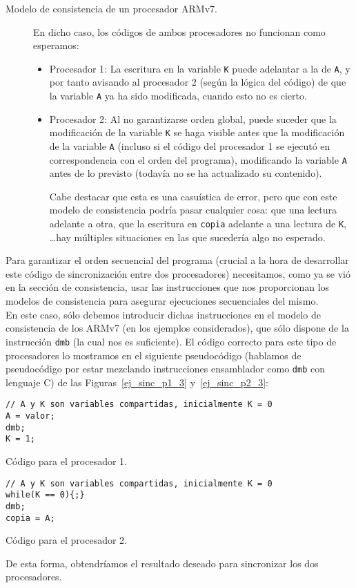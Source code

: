 \begin{ejemplo}
\begin{description}
    \item [Modelo de consistencia de un procesador ARMv7.] En dicho caso, los códigos de ambos procesadores no funcionan como esperamos:
        \begin{itemize}
            \item Procesador 1: La escritura en la variable \verb|K| puede adelantar a la de \verb|A|, y por tanto avisando al procesador 2 (según la lógica del código) de que la variable \verb|A| ya ha sido modificada, cuando esto no es cierto.
            \item Procesador 2: Al no garantizarse orden global, puede suceder que la modificación de la variable \verb|K| se haga visible antes que la modificación de la variable \verb|A| (incluso si el código del procesador 1 se ejecutó en correspondencia con el orden del programa), modificando la variable \verb|A| antes de lo previsto (todavía no se ha actualizado su contenido). 

                Cabe destacar que esta es una casuística de error, pero que con este modelo de consistencia podría pasar cualquier cosa: que una lectura adelante a otra, que la escritura en \verb|copia| adelante a una lectura de \verb|K|, \ldots hay múltiples situaciones en las que sucedería algo no esperado.
        \end{itemize}
\end{description}
Para garantizar el orden secuencial del programa (crucial a la hora de desarrollar este código de sincronización entre dos procesadores) necesitamos, como ya se vió en la sección de consistencia, usar las instrucciones que nos proporcionan los modelos de consistencia para asegurar ejecuciones secuenciales del mismo.\\

En este caso, sólo debemos introducir dichas instrucciones en el modelo de consistencia de los ARMv7 (en los ejemplos considerados), que sólo dispone de la instrucción \verb|dmb| (la cual nos es suficiente). El código correcto para este tipo de procesadores lo mostramos en el siguiente pseudocódigo (hablamos de pseudocódigo por estar mezclando instrucciones ensamblador como \verb|dmb| con lenguaje C) de las Figuras~\ref{ej_sinc_p1_3} y~\ref{ej_sinc_p2_3}:
\begin{listing}[H]
\centering
\begin{verbatim}
// A y K son variables compartidas, inicialmente K = 0
A = valor;
dmb;
K = 1;
\end{verbatim}
\caption{Código para el procesador 1.}
\label{ej_sinc_p1_3}
\end{listing}
\begin{listing}[H]
\centering
\begin{verbatim}
// A y K son variables compartidas, inicialmente K = 0
while(K == 0){;}
dmb;
copia = A;
\end{verbatim}
\caption{Código para el procesador 2.}
\label{ej_sinc_p2_3}
\end{listing}

De esta forma, obtendríamos el resultado deseado para sincronizar los dos procesadores.

\end{ejemplo}
